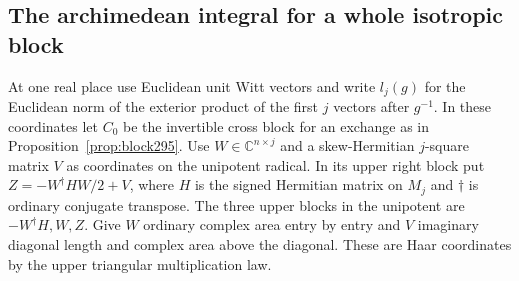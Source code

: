 \documentclass[a4paper,11pt]{article}
\theoremstyle{definition}
\theoremstyle{remark}
\numberwithin{equation}{section}
\begin{document}
\subsection{The archimedean integral for a whole isotropic block}\label{nav:III-60}
At one real place use Euclidean unit Witt vectors and
write \(l_j(g)\) for the Euclidean norm of the exterior
product of the first \(j\) vectors after \(g^{-1}\).
In these coordinates let \(C_0\) be the invertible
cross block for an exchange as in Proposition~\ref{prop:block295}.
Use \(W\in\mathbb C^{n\times j}\) and a skew-Hermitian
\(j\)-square matrix \(V\) as coordinates on the unipotent
radical. In its upper right block put
\(Z=-W^\dagger H W/2+V\), where \(H\) is the signed
Hermitian matrix on \(M_j\) and \(\dagger\) is ordinary
conjugate transpose. The three upper blocks in the
unipotent are \(-W^\dagger H,W,Z\). Give \(W\) ordinary
complex area entry by entry and \(V\) imaginary diagonal
length and complex area above the diagonal. These are Haar
coordinates by the upper triangular multiplication law.
\end{document}
